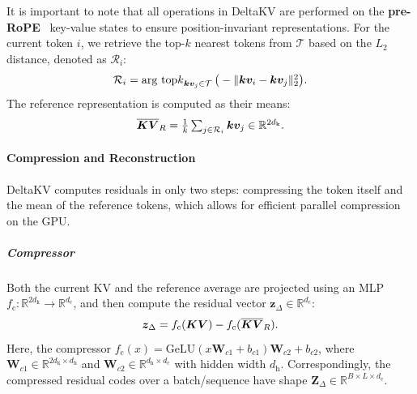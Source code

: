 It is important to note that all operations in DeltaKV are performed on the \textbf{pre-RoPE}~\cite{su2024roformer} key-value states to ensure position-invariant representations.
For the current token $i$, we retrieve the top-$k$ nearest tokens from $\mathcal{T}$ based on the $L_2$ distance, denoted as $\mathcal{R}_i$:
\vspace{-0.25em}
\begin{displaymath}
  \textstyle \mathcal{R}_i = \mathop{\mathrm{arg~top}k}_{\bm{kv}_j \in \mathcal{T}} \big( - \|\bm{kv}_i - \bm{kv}_j\|_2^2 \big).
  \vspace{-0.25em}
\end{displaymath}
The reference representation is computed as their means: %
\vspace{-0.25em}
\begin{displaymath}
  \textstyle \overline{\bm{KV}}_R = \frac{1}{k} \sum_{j\in \mathcal{R}_i} \bm{kv}_j \in \mathbb{R}^{2d_\mathrm{k}}.
  \vspace{-0.25em}
\end{displaymath}


\paragraph{Compression and Reconstruction}
DeltaKV computes residuals in only two steps: compressing the token itself and the mean of the reference tokens, which allows for efficient parallel compression on the GPU.

\vspace{-0.25em}
\subparagraph{Compressor} 
Both the current KV and the reference average are projected using an MLP $f_\mathrm{c}:\mathbb{R}^{2d_\mathrm{k}}\rightarrow \mathbb{R}^{d_\mathrm{c}}$, and then compute the residual vector $\bm{z}_\Delta \in \mathbb{R}^{d_\mathrm{c}}$:
\vspace{-0.25em}
\begin{displaymath}
  \bm{z}_\Delta = f_\mathrm{c}(\bm{KV}) - f_\mathrm{c}(\overline{\bm{KV}}_R).
  \vspace{-0.25em}
\end{displaymath}
Here, the compressor $f_\mathrm{c}(x) = \mathrm{GeLU}(x \bm{W}_{c1}+b_{c1}) \bm{W}_{c2}+b_{c2}$, where $\bm{W}_{c1}\in \mathbb{R}^{2d_\mathrm{k}\times d_\mathrm{h}}$ and $\bm{W}_{c2} \in \mathbb{R}^{d_\mathrm{h}\times d_\mathrm{c}}$ with hidden width $d_\mathrm{h}$.
Correspondingly, the compressed residual codes over a batch/sequence have shape $\bm{Z}_\Delta \in \mathbb{R}^{B\times L\times d_\mathrm{c}}$.

